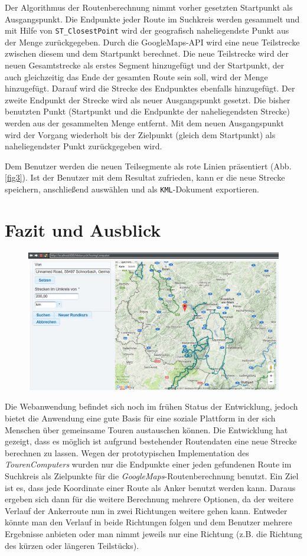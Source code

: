 \documentclass[a4paper,11pt,utf8]{scrartcl}
\begin{document}
Der Algorithmus der Routenberechnung nimmt vorher gesetzten Startpunkt als Ausgangspunkt. Die Endpunkte jeder Route im Suchkreis werden gesammelt und mit Hilfe von \texttt{ST\_ClosestPoint} wird der geografisch naheliegendste Punkt aus der Menge zurückgegeben. Durch die GoogleMaps-API wird eine neue Teilstrecke zwischen diesem und dem Startpunkt berechnet. Die neue Teilstrecke wird der neuen Gesamtstrecke als erstes Segment hinzugefügt und der Startpunkt, der auch gleichzeitig das Ende der gesamten Route sein soll, wird der Menge hinzugefügt. Darauf wird die Strecke des Endpunktes ebenfalls hinzugefügt. Der zweite Endpunkt der Strecke wird als neuer Ausgangspunkt gesetzt. Die bisher benutzten Punkt (Startpunkt und die Endpunkte der naheliegendsten Strecke) werden aus der gesammelten Menge entfernt. Mit dem neuen Ausgangspunkt wird der Vorgang wiederholt bis der Zielpunkt (gleich dem Startpunkt) als naheliegendster Punkt zurückgegeben wird.

Dem Benutzer werden die neuen Teilsegmente als rote Linien präsentiert (Abb. \ref{fig3}). Ist der Benutzer mit dem Resultat zufrieden, kann er die neue Strecke speichern, anschließend auswählen und als \texttt{KML}-Dokument exportieren.

\section{Fazit und Ausblick}
\begin{figure}[htb]
        \centering
        \includegraphics[width=.75\linewidth]{pics/index.PNG}
\end{figure}
Die Webanwendung befindet sich noch im frühen Status der Entwicklung, jedoch bietet die Anwendung eine gute Basis für eine soziale Plattform in der sich Menschen über gemeinsame Touren austauschen können. Die Entwicklung hat gezeigt, dass es möglich ist aufgrund bestehender Routendaten eine neue Strecke berechnen zu lassen. Wegen der prototypischen Implementation des \textit{TourenComputers} wurden nur die Endpunkte einer jeden gefundenen Route im Suchkreis als Zielpunkte für die \textit{GoogleMaps}-Routenberechnung benutzt. Ein Ziel ist es, dass jede Koordinate einer Route als Anker benutzt werden kann. Daraus ergeben sich dann für die weitere Berechnung mehrere Optionen, da der weitere Verlauf der Ankerroute nun in zwei Richtungen weitere gehen kann. Entweder könnte man den Verlauf in beide Richtungen folgen und dem Benutzer mehrere Ergebnisse anbieten oder man nimmt jeweils nur eine Richtung (z.B. die Richtung des kürzen oder längeren Teilstücks).
\end{document}
